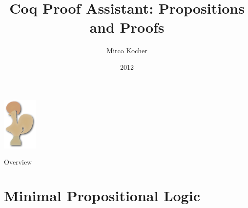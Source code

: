 
\title{Coq Proof Assistant: Propositions and Proofs}
\author{Mirco Kocher}
\date{2012}


{ \logo{} %
\begin{frame} %
	\begin{center}
		\includegraphics{coq_logo.png}
	\end{center}	
	\titlepage	
\end{frame}
}

\begin{frame}{Overview}
\end{frame}

\section{Minimal Propositional Logic}

